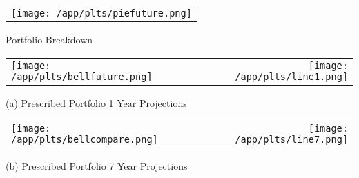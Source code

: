 \documentclass{article}
\begin{document}
\begin{adjustwidth}{-.3in}{0in}%
\vspace*{-1cm}

\begin{center}
  \begin{tabular}{c}
    \texttt{[image: /app/plts/piefuture.png]}
  \end{tabular}
  \end{center}

  \begin{center}
        Portfolio Breakdown
  \end{center}

\vspace{.7cm}


\begin{center}
  \begin{tabular}{lcr}
  \texttt{[image: /app/plts/bellfuture.png]}
    & \hspace{1cm }&\texttt{[image: /app/plts/line1.png]}
  \end{tabular}
  \end{center}

  \begin{center}
      (a) Prescribed Portfolio 1 Year Projections
  \end{center}

  \vspace{.7cm}


\begin{center}
  \begin{tabular}{lcr}
  \texttt{[image: /app/plts/bellcompare.png]}
    & \hspace{1cm }&\texttt{[image: /app/plts/line7.png]}
  \end{tabular}
  \end{center}

  \begin{center}
      (b) Prescribed Portfolio 7 Year Projections
  \end{center}

\vspace{.6cm}

\end{adjustwidth}
\end{document}
